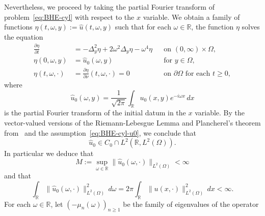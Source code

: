 \documentclass[a4paper, reqno]{amsart}
\numberwithin{equation}{section}
\theoremstyle{plain}
\theoremstyle{definition}
\theoremstyle{remark}
\newcommand{\RR}{\mathbb{R}}
\begin{document}
Nevertheless, we proceed by taking the partial Fourier transform of problem~\eqref{eq:BHE-cyl} with respect to the $x$ variable. We obtain a family of functions $\eta(t, \omega, y) := \widehat{u}(t, \omega, y)$ such that for each $\omega \in \RR$, the function $\eta$ solves the equation
\begin{equation}
  \label{eq:eta-eq}
  \begin{aligned}
    \frac{\partial \eta}{\partial t} & = -\Delta_y^2 \eta + 2 \omega^2 \Delta_y \eta - \omega^4 \eta
                                     &                                                               & \text{on } (0, \infty) \times \Omega,                                                          \\
    \eta(0, \omega, y)               & = \widehat{u}_0(\omega,y)
                                     &                                                               & \text{for } y \in \Omega,                                                                      \\
    \eta(t,\omega,\cdot)             & = \frac{\partial \eta}{\partial \nu}(t,\omega,\cdot) = 0      &                                       & \text{on } \partial \Omega \text{ for each } t \geq 0,
  \end{aligned}
\end{equation}
where
\begin{equation*}
  \widehat{u}_0(\omega,y) = \frac{1}{\sqrt{2\pi}}\int_\RR u_0(x,y) e^{-i \omega x} \,d x
\end{equation*}
is the partial Fourier transform of the initial datum in the $x$ variable. By the vector-valued versions of the Riemann-Lebesgue Lemma and Plancherel's theorem from~\cite[Theorems~1.8.1, and~1.8.2]{ABHN} and the assumption~\eqref{eq:BHE-cyl-u0}, we conclude that
\begin{equation}
  \label{eq:u0-hat}
  \widehat{u}_0 \in C_0 \cap L^2(\RR, L^2(\Omega)).
\end{equation}
In particular we deduce that
\begin{equation}
  \label{eq:u0-hat-bounded}
  M:=\sup_{\omega \in \RR} \| \widehat{u}_0(\omega, \cdot) \|_{L^2(\Omega)} < \infty
\end{equation}
and that
\begin{equation}
  \label{eq:u0-hat-plancerel}
  \int_\RR \| \widehat{u}_0(\omega, \cdot) \|^2_{L^2(\Omega)} \, d\omega
  = 2\pi\int_\RR \|u(x, \cdot)\|^2_{L^2(\Omega)} \, dx
  < \infty.
\end{equation}
For each $\omega\in\RR$, let $(-\mu_n(\omega))_{n \geq 1}$ be the family of eigenvalues  of the operator
\end{document}
